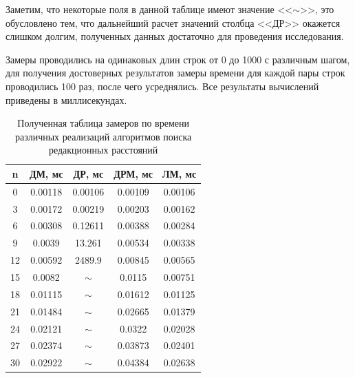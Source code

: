 Заметим, что некоторые поля в данной таблице
имеют значение <<$\sim$>>, это обусловлено тем, что дальнейший расчет значений столбца <<ДР>> окажется слишком
долгим, полученных данных достаточно для проведения исследования.

Замеры проводились на одинаковых длин строк от 0 до 1000 с различным шагом, для получения достоверных результатов замеры 
времени для каждой пары строк проводились 100 раз, после чего усреднялись. Все результаты вычислений приведены в миллисекундах.




\begin{table}[!ht]
	\centering
	\caption{Полученная таблица замеров по времени различных реализаций алгоритмов поиска редакционных расстояний}
	\begin{tabular}{|c|c|c|c|c|}
	\hline
	n  & ДМ, мс & ДР, мс & ДРМ, мс & ЛМ, мс \\
	\hline
		0    & 0.00118            & 0.00106               & 0.00109                     & 0.00106                \\ \hline
		3    & 0.00172            & 0.00219               & 0.00203                     & 0.00162                \\ \hline
		6    & 0.00308            & 0.12611               & 0.00388                     & 0.00284                \\ \hline
		9    & 0.0039             & 13.261                & 0.00534                     & 0.00338                \\ \hline
		12   & 0.00592            & 2489.9                & 0.00845                     & 0.00565                \\ \hline
		15   & 0.0082             & $\sim$                & 0.0115                      & 0.00751                \\ \hline
		18   & 0.01115            & $\sim$                & 0.01612                     & 0.01125                \\ \hline
		21   & 0.01484            & $\sim$                & 0.02665                     & 0.01379                \\ \hline
		24   & 0.02121            & $\sim$                & 0.0322                      & 0.02028                \\ \hline
		27   & 0.02374            & $\sim$                & 0.03873                     & 0.02401                \\ \hline
		30   & 0.02922            & $\sim$                & 0.04384                     & 0.02638                \\ \hline

\end{tabular}
\end{table}
